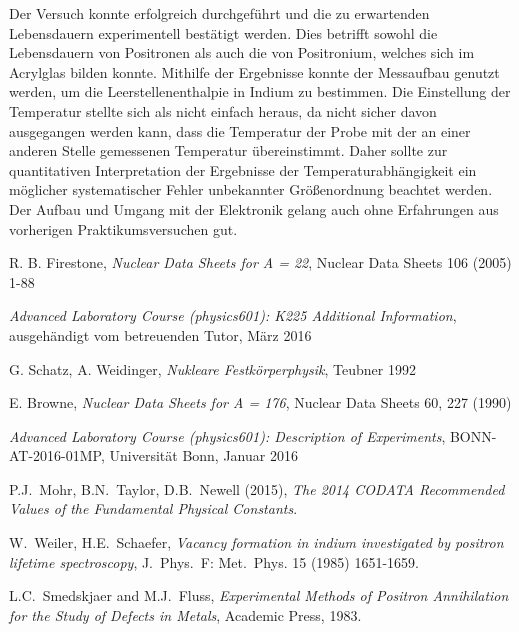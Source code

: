 \documentclass[11pt, a4paper]{article}
\numberwithin{equation}{section}
\begin{document}
Der Versuch konnte erfolgreich durchgeführt und die zu erwartenden Lebensdauern experimentell bestätigt werden.
Dies betrifft sowohl die Lebensdauern von Positronen als auch die von Positronium, welches sich im Acrylglas bilden konnte.
Mithilfe der Ergebnisse konnte der Messaufbau genutzt werden, um die Leerstellenenthalpie in Indium zu bestimmen.
Die Einstellung der Temperatur stellte sich als nicht einfach heraus, da nicht sicher davon ausgegangen werden kann, dass die Temperatur der Probe mit der an einer anderen Stelle gemessenen Temperatur übereinstimmt.
Daher sollte zur quantitativen Interpretation der Ergebnisse der Temperaturabhängigkeit ein möglicher systematischer Fehler unbekannter Größenordnung beachtet werden.
Der Aufbau und Umgang mit der Elektronik gelang auch ohne Erfahrungen aus vorherigen Praktikumsversuchen gut.

\FloatBarrier
\vspace{\fill}
\begin{thebibliography}{19}
	R. B. Firestone, \emph{Nuclear Data Sheets for A = 22}, Nuclear Data Sheets 106 (2005) 1-88
	
	\emph{Advanced Laboratory Course (physics601): K225 Additional Information}, ausgehändigt vom betreuenden Tutor, März 2016
	
	G. Schatz, A. Weidinger, \emph{Nukleare Festkörperphysik}, Teubner 1992
	
	E. Browne, \emph{Nuclear Data Sheets for A = 176}, Nuclear Data Sheets 60, 227 (1990)
	
	\emph{Advanced Laboratory Course (physics601): Description of Experiments}, BONN-AT-2016-01MP, Universität Bonn, Januar 2016

	P.J.\ Mohr, B.N.\ Taylor, D.B.\ Newell (2015),
	\emph{The 2014 CODATA Recommended Values of the Fundamental Physical Constants}.

	W.\ Weiler, H.E.\ Schaefer,
	\emph{Vacancy formation in indium investigated by positron lifetime spectroscopy},
	J.\ Phys.\ F: Met.\ Phys. 15 (1985) 1651-1659.

	L.C.\ Smedskjaer and M.J.\ Fluss,
	\emph{Experimental Methods of Positron Annihilation for the Study of Defects in Metals},
	Academic Press, 1983.
	
\end{thebibliography}
\end{document}

